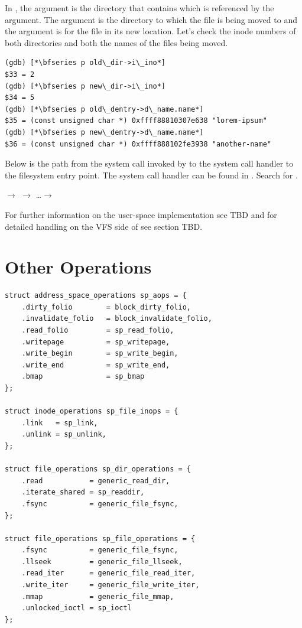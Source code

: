 \noindent
In , the  argument is the directory that contains  which is referenced by the  argument. The  argument is the directory to which the file is being moved to and the  argument is for the file in its new location. Let's check the inode numbers of both directories and both the names of the files being moved.

\begin{lstlisting}
(gdb) [*\bfseries p old\_dir->i\_ino*]
$33 = 2
(gdb) [*\bfseries p new\_dir->i\_ino*]
$34 = 5
(gdb) [*\bfseries p old\_dentry->d\_name.name*]
$35 = (const unsigned char *) 0xffff88810307e638 "lorem-ipsum"
(gdb) [*\bfseries p new\_dentry->d\_name.name*]
$36 = (const unsigned char *) 0xffff888102fe3938 "another-name"
\end{lstlisting}

\noindent
Below is the path from the  system call invoked by  to the system call handler to the filesystem entry point. The  system call handler can be found in . Search for .

\small
\bigskip
{} $\rightarrow$   $\rightarrow$ \ldots $\rightarrow$ 

\bigskip
\normalsize
\noindent
For further information on the user-space implementation see TBD and for detailed handling on the VFS side of  see section TBD.


\section{Other Operations}

\begin{lstlisting}
struct address_space_operations sp_aops = {
	.dirty_folio        = block_dirty_folio,
	.invalidate_folio   = block_invalidate_folio,
	.read_folio         = sp_read_folio,
	.writepage          = sp_writepage,
	.write_begin        = sp_write_begin,
	.write_end          = sp_write_end,
	.bmap               = sp_bmap
};  

struct inode_operations sp_file_inops = {
	.link   = sp_link,
	.unlink = sp_unlink,
};

struct file_operations sp_dir_operations = {
	.read           = generic_read_dir, 
	.iterate_shared = sp_readdir,
	.fsync          = generic_file_fsync,
}; 

struct file_operations sp_file_operations = {
	.fsync          = generic_file_fsync,
	.llseek         = generic_file_llseek,
	.read_iter      = generic_file_read_iter,
	.write_iter     = generic_file_write_iter,
	.mmap           = generic_file_mmap,
	.unlocked_ioctl = sp_ioctl
};
\end{lstlisting}

